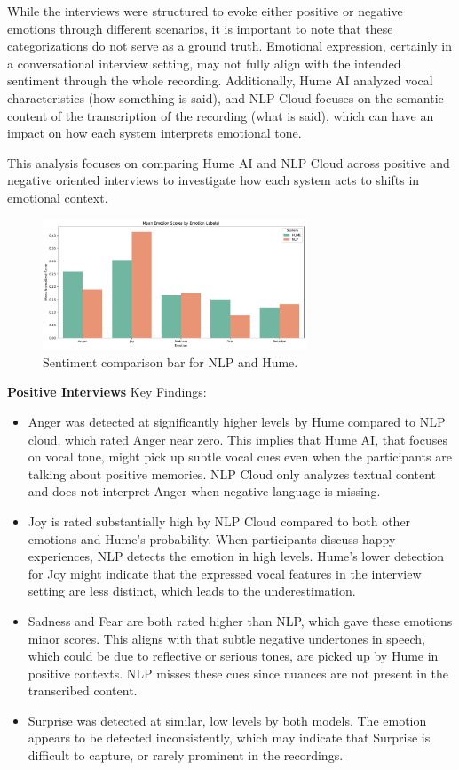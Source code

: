 While the interviews were structured to evoke either positive or negative emotions through different scenarios, it is important to note that these categorizations do not serve as a ground truth. 
Emotional expression, certainly in a conversational interview setting, may not fully align with the intended sentiment through the whole recording. 
Additionally, Hume AI analyzed vocal characteristics (how something is said), and NLP Cloud focuses on the semantic content of the transcription of the recording (what is said), which can have an impact on how each system interprets emotional tone. 

This analysis focuses on comparing Hume AI and NLP Cloud across positive and negative oriented interviews to investigate how each system 
acts to shifts in emotional context. 

\begin{figure}[!h]
    \centering
    \includegraphics[width=0.7\textwidth]{png/results/rq2/sentiment_comparison_bar.pdf}
    \caption{Sentiment comparison bar for NLP and Hume.}
    \label{fig:sentiment-comp-rq2}
\end{figure}

\textbf{Positive Interviews}
Key Findings:
\begin{itemize}
    \item Anger was detected at significantly higher levels by Hume compared to NLP cloud, which rated Anger near zero. 
    This implies that Hume AI, that focuses on vocal tone, might pick up subtle vocal cues even when the participants are talking about positive memories. 
    NLP Cloud only analyzes textual content and does not interpret Anger when negative language is missing. 
    \item Joy is rated substantially high by NLP Cloud compared to both other emotions and Hume's probability. When participants discuss happy experiences, NLP 
    detects the emotion in high levels. Hume's lower detection for Joy might indicate that the expressed vocal features in the interview setting are less distinct,
    which leads to the underestimation. 
    \item Sadness and Fear are both rated higher than NLP, which gave these emotions minor scores. This aligns with that subtle negative undertones in speech, which could be due to reflective or 
    serious tones, are picked up by Hume in positive contexts. NLP misses these cues since nuances are not present in the transcribed content. 
    \item Surprise was detected at similar, low levels by both models. The emotion appears to be detected inconsistently, which may indicate that Surprise is difficult to capture, or rarely prominent in the recordings. 
\end{itemize}

